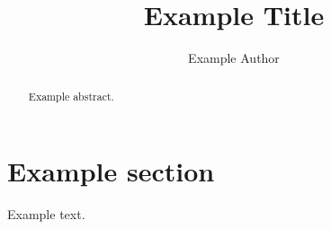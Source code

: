 \documentclass{llncs}
\begin{document}
%
\frontmatter          %

%
\mainmatter              %
%
\title{Example Title} %
%
%
\author{Example Author}%
%
%
%

\maketitle              %

\begin{abstract}
Example abstract.%
\end{abstract}
%
\section{Example section} %
Example text. \cite{example} %

%
%
{}


\clearpage
\end{document}

